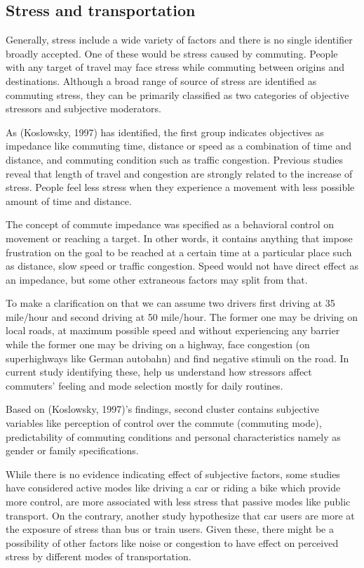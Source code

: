 \documentclass[
11pt, %
oneside, %
english, %
singlespacing, %
]{macthesis} %
\begin{document}
\hypertarget{stress-and-transportation}{%
\subsection{Stress and transportation}\label{stress-and-transportation}}

Generally, stress include a wide variety of factors and there is no single identifier broadly accepted. One of these would be stress caused by commuting. People with any target of travel may face stress while commuting between origins and destinations. Although a broad range of source of stress are identified as commuting stress, they can be primarily classified as two categories of objective stressors and subjective moderators.

As (Koslowsky, 1997) has identified, the first group indicates objectives as impedance like commuting time, distance or speed as a combination of time and distance, and commuting condition such as traffic congestion. Previous studies reveal that length of travel and congestion are strongly related to the increase of stress. People feel less stress when they experience a movement with less possible amount of time and distance.

The concept of commute impedance was specified as a behavioral control on movement or reaching a target. In other words, it contains anything that impose frustration on the goal to be reached at a certain time at a particular place such as distance, slow speed or traffic congestion. Speed would not have direct effect as an impedance, but some other extraneous factors may split from that.

To make a clarification on that we can assume two drivers first driving at 35 mile/hour and second driving at 50 mile/hour. The former one may be driving on local roads, at maximum possible speed and without experiencing any barrier while the former one may be driving on a highway, face congestion (on superhighways like German autobahn) and find negative stimuli on the road. In current study identifying these, help us understand how stressors affect commuters' feeling and mode selection mostly for daily routines.

Based on (Koslowsky, 1997)'s findings, second cluster contains subjective variables like perception of control over the commute (commuting mode), predictability of commuting conditions and personal characteristics namely as gender or family specifications.

While there is no evidence indicating effect of subjective factors, some studies have considered active modes like driving a car or riding a bike which provide more control, are more associated with less stress that passive modes like public transport. On the contrary, another study hypothesize that car users are more at the exposure of stress than bus or train users. Given these, there might be a possibility of other factors like noise or congestion to have effect on perceived stress by different modes of transportation.
\end{document}
